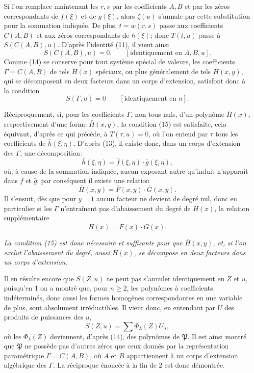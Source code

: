 \documentclass[11pt]{article}
\begin{document}
Si l'on remplace maintenant les $r,s$ par les coefficients $A,B$ et par les zéros correspondants de $f(\xi)$ et de $g(\xi)$, alors $\zeta(u)$ s'annule par cette substitution pour la sommation indiquée. De plus, $t=w(r,s)$ passe aux coefficients $C(A,B)$ et aux zéros correspondants de $h(\xi)$; donc $T(t,u)$ passe à $S(C(A,B),u)$. D'après l'identité (11), il vient ainsi
\begin{equation}
 S(C(A,B),u)=0.\qquad[\text{identiquement en }A,B,u].
\tag{14}
\end{equation}
Comme (14) se conserve pour tout système spécial de valeurs, les coefficients $\Gamma=C(A,B)$ de tels $\bar H(x)$ spéciaux, ou plus généralement de tels $\bar H(x,y)$, qui se décomposent en deux facteurs dans un corps d'extension, satisfont donc à la condition
\begin{equation}
 S(\Gamma,u)=0\qquad[\text{identiquement en }u].
\tag{15}
\end{equation}

Réciproquement, si, pour les coefficients $\Gamma$, non tous nuls, d'un polynôme $\bar H(x)$, respectivement d'une forme $\bar H(x,y)$, la condition (15) est satisfaite, cela équivaut, d'après ce qui précède, à $T(\tau,u)=0$, où l'on entend par $\tau$ tous les coefficients de $\bar h(\xi,\eta)$. D'après (13), il existe donc, dans un corps d'extension des $\Gamma$, une décomposition:
\[
 \bar h(\xi,\eta)=\bar f(\xi,\eta)\cdot\bar g(\xi,\eta),
\]
où, à cause de la sommation indiquée, aucun exposant autre qu'induit n'apparaît dans $\bar f$ et $\bar g$; par conséquent il existe une relation
\[
 \bar H(x,y)=\bar F(x,y)\cdot\bar G(x,y).
\]
Il s'ensuit, dès que pour $y=1$ aucun facteur ne devient de degré nul, donc en particulier si les $\Gamma$ n'entraînent pas d'abaissement du degré de $\bar H(x)$, la relation supplémentaire
\[
 \bar H(x)=\bar F(x)\cdot\bar G(x).
\]

\emph{La condition (15) est donc nécessaire et suffisante pour que $\bar H(x,y)$, et, si l'on exclut l'abaissement du degré, aussi $\bar H(x)$, se décompose en deux facteurs dans un corps d'extension.}

Il en résulte encore que $S(Z,u)$ ne peut pas s'annuler identiquement en $Z$ et $u$, puisqu'en 1 on a montré que, pour $n\ge2$, les polynômes à coefficients indéterminés, donc aussi les formes homogènes correspondantes en une variable de plus, sont absolument irréductibles. Il vient donc, en entendant par $U$ des produits de puissances des $u$,
\[
 S(Z,u)=\sum \Phi_\lambda(Z)U_\lambda,
\]
où les $\Phi_\lambda(Z)$ deviennent, d'après (14), des polynômes de $\mathfrak P$. Il est ainsi montré que $\mathfrak P$ ne possède pas d'autres zéros que ceux donnés par la représentation paramétrique $\Gamma=C(A,B)$, où $A$ et $B$ appartiennent à un corps d'extension algébrique des $\Gamma$. La réciproque énoncée à la fin de 2 est donc démontrée.
\end{document}
